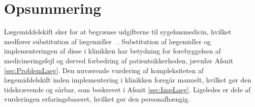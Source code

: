 

\section{Opsummering}
Lægemiddelskift sker for at begrænse udgifterne til sygehusmedicin, hvilket medfører substitution af lægemidler ~\citep{Ess2003, Johnston2011}. Substitution af lægemidler og implementeringen af disse i klinikken har betydning for forebyggelsen af medicineringsfejl og derved forbedring af patientsikkerheden, jævnfør Afsnit \ref{sec:ProblemLaeg}. Den nuværende vurdering af kompleksiteten af lægemiddelskift inden implementering i klinikken foregår manuelt, hvilket gør den tidskrævende og sårbar, som beskrevet i Afsnit \ref{sec:ImpLaeg}. Ligeledes er dele af vurderingen erfaringsbaseret, hvilket gør den personafhængig.

